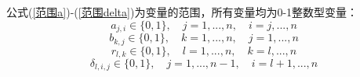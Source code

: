 \documentclass[bwprint]{gmcmthesis}
\begin{document}
公式(\ref{范围a})-(\ref{范围delta})为变量的范围，所有变量均为0-1整数型变量：
\begin{equation}
    a_{j,i} \in \{0,1\}, \quad j=1,...,n , \quad i=j,...,n \label{范围a}
\end{equation}
\begin{equation}
    b_{k,j} \in \{0,1\}, \quad k=1,...,n , \quad j=1,...,n \label{范围b}
\end{equation}
\begin{equation}
    r_{l,k} \in \{0,1\}, \quad l=1,...,n , \quad k=l,...,n \label{范围r}
\end{equation}
\begin{equation}
    \delta_{l,i,j} \in \{0,1\}, \quad j=1,...,n-1 , \quad i=l+1,...,n \label{范围delta}
\end{equation}
\end{document}

